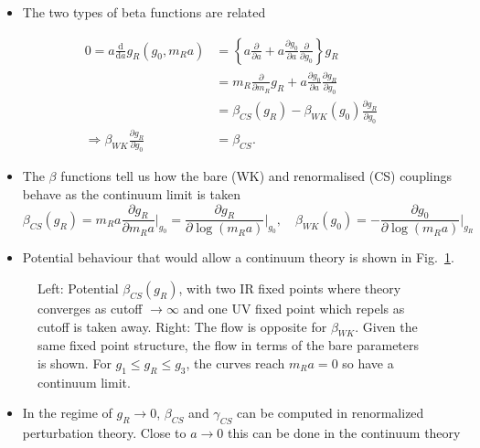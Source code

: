 \begin{itemize}
    \item The two types of beta functions are related
\end{itemize}
\begin{align}
    0 = a \frac{\text{d}}{\text{d}a} g_R(g_0, m_R a) &= \left \{ a \frac{\partial}{\partial a} + a \frac{\partial g_0}{\partial a} \frac{\partial}{\partial g_0}\right \} g_R \nonumber \\
    &= m_R \frac{\partial}{\partial m_R}g_R + a \frac{\partial g_0}{\partial a} \frac{\partial g_R}{\partial g_0} \nonumber \\
    &= \beta_{CS}(g_R) - \beta_{WK}(g_0) \frac{\partial g_R}{\partial g_0} \nonumber \\
    \Rightarrow \beta_{WK}\frac{\partial g_R}{\partial g_0} &= \beta_{CS}.
\end{align}
\begin{itemize}
    \item The $\beta$ functions tell us how the bare (WK) and renormalised (CS) couplings behave as the continuum limit is taken
\begin{equation}
    \beta_{CS}(g_R) = m_R a \frac{\partial g_R}{\partial m_R a}\bigg|_{g_0} = \frac{\partial g_R}{\partial \log(m_R a)}\bigg|_{g_0}, \quad \beta_{WK}(g_0) = -\frac{\partial g_0}{\partial \log (m_R a)}\bigg|_{g_R}
\end{equation}

\item Potential behaviour that would allow a continuum theory is shown in Fig.~\ref{fig:potential_flow}.
\end{itemize}
\begin{figure}
    \centering
    \qquad
    \caption{Left: Potential $\beta_{CS}(g_R)$, with two IR fixed points where theory converges as cutoff $\to\infty$ and one UV fixed point which repels as cutoff is taken away.
    Right: The flow is opposite for $\beta_{WK}$. Given the same fixed point structure, the flow in terms of the bare parameters is shown. For $g_1\leq g_R \leq g_3$, the curves reach $m_R a=0$ so have a continuum limit.
    \label{fig:potential_flow}}
\end{figure}
\begin{itemize}
  \item In the regime of $g_R \rightarrow 0$, $\beta_{CS}$ and $\gamma_{CS}$ can be computed in renormalized perturbation theory. Close to $a \rightarrow 0$ this can be done in the continuum theory
\end{itemize}

